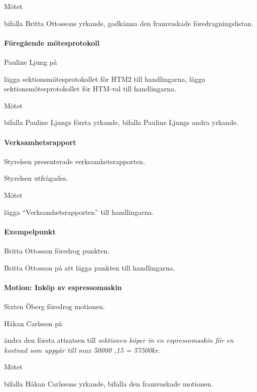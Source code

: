 \documentclass{dsekminutes}
\begin{document}
Mötet 
\begin{attlist}
  \att bifalla Britta Ottossons yrkande,
  \att godkänna den framvaskade föredragningslistan.
\end{attlist}

\paragraph{Föregående mötesprotokoll}
Pauline Ljung \yrkade på
\begin{attlist}
  \att lägga sektionsmötesprotokollet för HTM2 till handlingarna,
  \att lägga sektionsmötesprotokollet för HTM-val till handlingarna.
\end{attlist}

Mötet 
\begin{attlist}
  \att bifalla Pauline Ljungs första yrkande,
  \att bifalla Pauline Ljungs andra yrkande.
\end{attlist}

\paragraph{Verksamhetsrapport}
Styrelsen presenterade verksamhetsrapporten.

Styrelsen utfrågades.

Mötet 
\begin{attlist}
  \att lägga “Verksamhetsrapporten” till handlingarna.
\end{attlist}

\paragraph{Exempelpunkt}
Britta Ottosson föredrog punkten.

Britta Ottosson \yrkade på att lägga punkten till handlingarna.

\paragraph{Motion: Inköp av espressomaskin}
Sixten Öberg föredrog motionen.

Håkan Carlsson  på
\begin{attlist}
  \att ändra den första attsatsen till \emph{sektionen köper in en
  espresso\-maskin för en kostnad som uppgår till max 50000 ,15 =
  57500kr.}
\end{attlist}

Mötet 
\begin{attlist}
  \att bifalla Håkan Carlssons yrkande,
  \att bifalla den framvaskade motionen.
\end{attlist}
\end{document}
